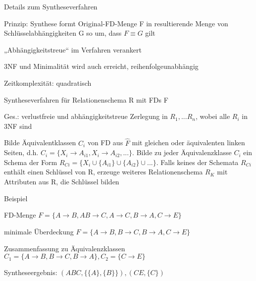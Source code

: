 \documentclass[a4paper]{article}
\begin{document}
\begin{multicols}{3}
Details zum Syntheseverfahren
\begin{itemize*}
    \item Prinzip: Synthese formt Original-FD-Menge F in resultierende Menge von Schlüsselabhängigkeiten G so um, dass $F\equiv G$ gilt
    \item „Abhängigkeitstreue“ im Verfahren verankert
    \item 3NF und Minimalität wird auch erreicht, reihenfolgeunabhängig
    \item Zeitkomplexität: quadratisch
\end{itemize*}

Syntheseverfahren für Relationenschema R mit FDs F
\begin{itemize*}
    \item Ges.: verlustfreie und abhängigkeitstreue Zerlegung in $R_1,... R_n$, wobei alle $R_i$ in 3NF sind
    \item Bilde Äquivalentklassen $C_i$ von FD aus $\hat{F}$ mit gleichen oder äquivalenten linken Seiten, d.h. $C_i=\{X_i\rightarrow A_{i1},X_i\rightarrow A_{i2},...\}$. Bilde zu jeder Äquivalenzklasse $C_i$ ein Schema der Form $R_{Ci}=\{X_i\cup \{A_{i1}\}\cup \{A_{i2}\}\cup ... \}$. Falls keines der Schemata $R_{Ci}$ enthält einen Schlüssel von R, erzeuge weiteres Relationenschema $R_K$ mit Attributen aus R, die Schlüssel bilden
    \item Beispiel
    \begin{itemize*}
        \item FD-Menge $F=\{A\rightarrow B, AB\rightarrow C, A\rightarrow C, B\rightarrow A, C\rightarrow E\}$
        \item minimale Überdeckung $\hat{F}=\{A\rightarrow B,B\rightarrow C, B\rightarrow A, C\rightarrow E\}$
        \item Zusammenfassung zu Äquivalenzklassen $C_1=\{A\rightarrow B,B\rightarrow C, B\rightarrow A\}, C_2=\{C\rightarrow E\}$
        \item Syntheseergebnis: $(ABC,\{\{A\},\{B\}\}),(CE,\{C\})$
    \end{itemize*}
\end{itemize*}


\end{multicols}
\end{document}
